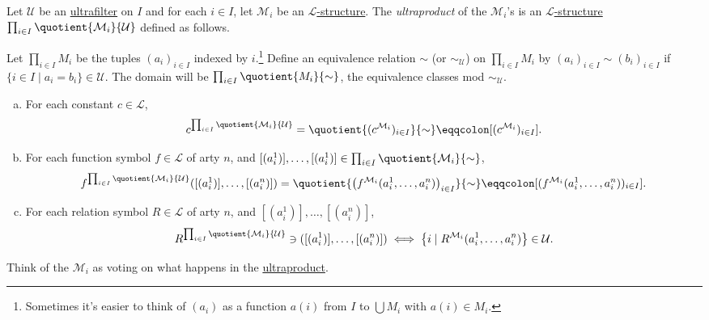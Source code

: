 \begin{definition}[Ultraproduct]\label{def:ultraproduct}
	Let \(\mathcal{U} \) be an \hyperref[def:ultrafilter]{ultrafilter} on \(I\) and for each \(i\in I\), let \(\mathcal{M} _i\) be an \hyperref[def:structure]{\(\mathcal{L} \)-structure}. The \emph{ultraproduct} of the \(\mathcal{M} _i\)'s is an \hyperref[def:structure]{\(\mathcal{L} \)-structure} \(\prod_{i\in I} \quotient{\mathcal{M} _i}{\mathcal{U}} \) defined as follows.

	Let \(\prod_{i\in I} M_i\) be the tuples \((a_i)_{i\in I}\) indexed by \(i\).\footnote{Sometimes it's easier to think of \((a_i)\) as a function \(a(i)\) from \(I\) to \(\bigcup M_i\) with \(a(i)\in M_i\).} Define an equivalence relation \(\sim \) (or \(\sim _{\mathcal{U} }\)) on \(\prod_{i\in I} M_i\) by \((a_i)_{i\in I} \sim (b_i)_{i\in I}\) if \(\{i\in I \mid a_i = b_i\}\in \mathcal{U} \). The domain will be \(\prod_{i\in I} \quotient{M_i}{\sim } \), the equivalence classes mod \(\sim _\mathcal{U} \).
	\begin{enumerate}[(a)]
		\item For each constant \(c\in \mathcal{L} \),
		      \[
			      c^{\prod_{i\in I} \quotient{\mathcal{M} _i}{\mathcal{U} } }
			      = \quotient{(c^{\mathcal{M} _i})_{i\in I}}{\sim }
			      \eqqcolon [(c^{\mathcal{M} _i})_{i\in I}].
		      \]
		\item For each function symbol \(f\in \mathcal{L} \) of arty \(n\), and \([(a_i^1)], \dots , [(a_i^1)] \in \prod_{i\in I} \quotient{\mathcal{M} _i}{\sim } \),
		      \[
			      f^{\prod_{i\in I} \quotient{\mathcal{M} _i}{\mathcal{U} } } ([(a^1_i)], \dots , [(a^n_i)])
			      = \quotient{\left( f^{\mathcal{M} _i} (a_i^1, \dots , a_i^n) \right) _{i\in I}}{\sim }
			      \eqqcolon [(f^{\mathcal{M} _i} (a^1_i, \dots , a^n_i))_{i\in I}].
		      \]
		\item For each relation symbol \(R\in \mathcal{L} \) of arty \(n\), and \([(a_i^1)], \dots , [(a_i^n)]\),
		      \[
			      R^{\prod_{i\in I} \quotient{\mathcal{M} _i}{\mathcal{U} } } \ni ([(a_i^1)], \dots , [(a_i^n)])
			      \iff \left\{ i \mid R^{\mathcal{M} _i} (a_i^1, \dots , a_i^n) \right\} \in \mathcal{U} .
		      \]
	\end{enumerate}
\end{definition}

\begin{intuition}
	Think of the \(\mathcal{M} _i\) as voting on what happens in the \hyperref[def:ultraproduct]{ultraproduct}.
\end{intuition}

